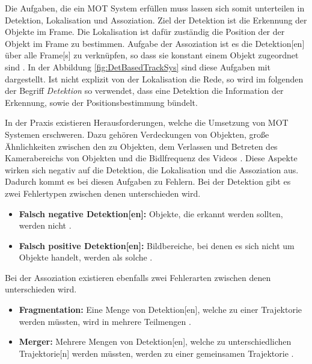 Die Aufgaben, die ein \gls{MOT} System erfüllen muss lassen sich somit unterteilen in \gls{Detektion}, \gls{Lokalisation} und \gls{Assoziation}. Ziel der \gls{Detektion} ist die Erkennung der Objekte im \gls{Frame}. Die \gls{Lokalisation} ist dafür zuständig die Position der der Objekt im \gls{Frame} zu bestimmen. Aufgabe der \gls{Assoziation} ist es die \gls{Detektion}[en] über alle \gls{Frame}[s] zu verknüpfen, so dass sie konstant einem Objekt zugeordnet sind \cite{CLEAR.2008, HOTA}. In der Abbildung \ref{fig:DetBasedTrackSys} sind diese Aufgaben mit dargestellt. Ist nicht explizit von der \gls{Lokalisation} die Rede, so wird im folgenden der Begriff \textit{\gls{Detektion}} so verwendet, dass eine \gls{Detektion} die Information der Erkennung, sowie der Positionsbestimmung bündelt. \par

In der Praxis existieren Herausforderungen, welche die Umsetzung von \gls{MOT} Systemen erschweren. Dazu gehören Verdeckungen von Objekten, große Ähnlichkeiten zwischen den zu  Objekten, dem Verlassen und Betreten des Kamerabereichs von Objekten und die Bidlfrequenz des Videos \cite{EMPTYCITE}.   Diese Aspekte wirken sich negativ auf die \gls{Detektion}, die \gls{Lokalisation} und die \gls{Assoziation} aus. Dadurch kommt es bei diesen Aufgaben zu Fehlern. Bei der \gls{Detektion} gibt es zwei Fehlertypen zwischen denen unterschieden wird. 

\begin{itemize}
    \item \textbf{Falsch negative \gls{Detektion}[en]:} Objekte, die erkannt werden sollten, werden nicht .
    \item \textbf{Falsch positive \gls{Detektion}[en]:} Bildbereiche, bei denen es sich nicht um Objekte handelt, werden als solche .
\end{itemize}

Bei der \gls{Assoziation} existieren ebenfalls zwei Fehlerarten zwischen denen unterschieden wird.

\begin{itemize}
    \item \textbf{Fragmentation:} Eine Menge von \gls{Detektion}[en], welche zu einer \gls{Trajektorie}  werden müssten, wird in mehrere Teilmengen .
    \item \textbf{Merger:} Mehrere Mengen von \gls{Detektion}[en], welche zu unterschiedlichen \gls{Trajektorie}[n]  werden müssten, werden zu einer gemeinsamen \gls{Trajektorie} .
\end{itemize}

